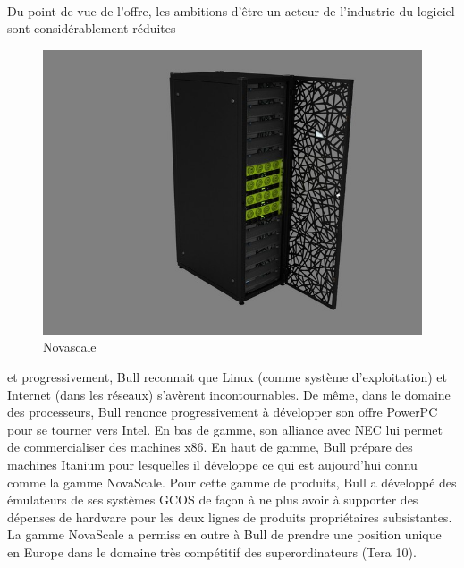 \documentclass[11pt]{article}
\begin{document}
		\paragraph{}
		Du point de vue de l'offre, les ambitions d'être un acteur de l'industrie du logiciel sont considérablement réduites 
		\begin{figure}
		\includegraphics[scale=1]{novascale.jpg}
		\caption{Novascale}
		\end{figure} 
		et progressivement, Bull reconnait que Linux (comme système d'exploitation) et Internet (dans les réseaux) s'avèrent 
		incontournables. De même, dans le domaine des processeurs, Bull renonce progressivement à développer son offre PowerPC 
		pour se tourner vers Intel.\newline{}
		En bas de gamme, son alliance avec NEC lui permet de commercialiser des machines x86. En haut de gamme, Bull prépare 
		des machines Itanium pour lesquelles il développe ce qui est aujourd'hui connu comme la gamme NovaScale.\newline{}
		Pour cette gamme de produits, Bull a développé des émulateurs de ses systèmes GCOS de façon à ne plus avoir à 
		supporter des dépenses de hardware pour les deux lignes de produits propriétaires subsistantes.\newline{}
		\newline{}
		\newline{}
		\newline{}
		La gamme NovaScale a permiss en outre à Bull de prendre une position unique en Europe dans le domaine très compétitif 
		des superordinateurs (Tera 10).
\end{document}
